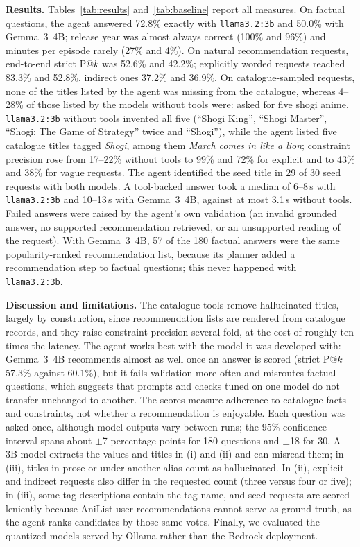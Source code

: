 \documentclass[a4paper,10pt]{article}
\begin{document}
\textbf{Results.} Tables~\ref{tab:results} and~\ref{tab:baseline} report all measures. On factual questions, the agent answered 72.8\% exactly with \texttt{llama3.2:3b} and 50.0\% with Gemma~3~4B; release year was almost always correct (100\% and 96\%) and minutes per episode rarely (27\% and 4\%). On natural recommendation requests, end-to-end strict P@$k$ was 52.6\% and 42.2\%; explicitly worded requests reached 83.3\% and 52.8\%, indirect ones 37.2\% and 36.9\%. On catalogue-sampled requests, none of the titles listed by the agent was missing from the catalogue, whereas 4--28\% of those listed by the models without tools were: asked for five shogi anime, \texttt{llama3.2:3b} without tools invented all five (``Shogi King'', ``Shogi Master'', ``Shogi: The Game of Strategy'' twice and ``Shogi''), while the agent listed five catalogue titles tagged \emph{Shogi}, among them \emph{March comes in like a lion}; constraint precision rose from 17--22\% without tools to 99\% and 72\% for explicit and to 43\% and 38\% for vague requests. The agent identified the seed title in 29 of 30 seed requests with both models. A tool-backed answer took a median of 6--8\,s with \texttt{llama3.2:3b} and 10--13\,s with Gemma~3~4B, against at most 3.1\,s without tools. Failed answers were raised by the agent's own validation (an invalid grounded answer, no supported recommendation retrieved, or an unsupported reading of the request). With Gemma~3~4B, 57 of the 180 factual answers were the same popularity-ranked recommendation list, because its planner added a recommendation step to factual questions; this never happened with \texttt{llama3.2:3b}.

\textbf{Discussion and limitations.} The catalogue tools remove hallucinated titles, largely by construction, since recommendation lists are rendered from catalogue records, and they raise constraint precision several-fold, at the cost of roughly ten times the latency. The agent works best with the model it was developed with: Gemma~3~4B recommends almost as well once an answer is scored (strict P@$k$ 57.3\% against 60.1\%), but it fails validation more often and misroutes factual questions, which suggests that prompts and checks tuned on one model do not transfer unchanged to another. The scores measure adherence to catalogue facts and constraints, not whether a recommendation is enjoyable. Each question was asked once, although model outputs vary between runs; the 95\% confidence interval spans about $\pm$7 percentage points for 180 questions and $\pm$18 for 30. A 3B model extracts the values and titles in (i) and (ii) and can misread them; in (iii), titles in prose or under another alias count as hallucinated. In (ii), explicit and indirect requests also differ in the requested count (three versus four or five); in (iii), some tag descriptions contain the tag name, and seed requests are scored leniently because AniList user recommendations cannot serve as ground truth, as the agent ranks candidates by those same votes. Finally, we evaluated the quantized models served by Ollama rather than the Bedrock deployment.
\end{document}
